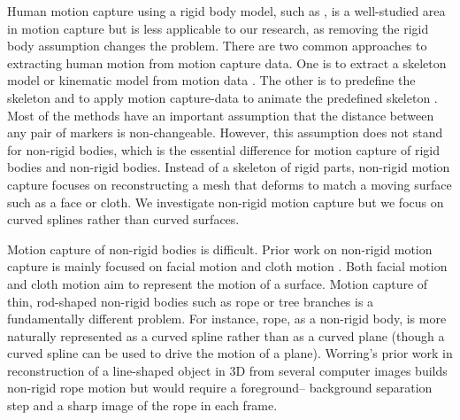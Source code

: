 Human motion capture using a rigid body model, such as \cite{Lou:EHM2010,Wen:2006:MCD,Rajko:2007:RAK,ZordanVictorBrian2003}, is a well-studied area in motion capture but is less applicable to our research, as removing the rigid body assumption changes the problem. There are two common approaches to extracting human motion from motion capture data. One is to extract a skeleton model or kinematic model from motion data \cite{Lou:EHM2010,Rajko:2007:RAK}. The other is to predefine the skeleton and to apply motion capture-data to animate the predefined skeleton \cite{Wen:2006:MCD,ZordanVictorBrian2003}. Most of the methods have an important assumption that the distance between any pair of markers is non-changeable. However, this assumption does not stand for non-rigid bodies, which is the essential difference for motion capture of rigid bodies and non-rigid bodies. Instead of a skeleton of rigid parts, non-rigid motion capture focuses on reconstructing a mesh that deforms to match a moving surface such as a face or cloth. We investigate non-rigid motion capture but we focus on curved splines rather than curved surfaces.

Motion capture of non-rigid bodies is difficult. Prior work on non-rigid motion capture is mainly focused on facial motion \cite{Lorenzo03,SifakisEftychios2005} and cloth motion \cite{MarcusVolker04clothmotion,whiteRyan2007siggraph,PritchardDavid2003,Bhat2003}. Both facial motion and cloth motion aim to represent the motion of a surface. Motion capture of thin, rod-shaped non-rigid bodies such as rope or tree branches is a fundamentally different problem. For instance, rope, as a non-rigid body, is more naturally represented as a curved spline rather than as a curved plane (though a curved spline can be used to drive the motion of a plane). Worring's \cite{WorringMarcel94measurementof} prior work in reconstruction of a line-shaped object in 3D from several computer images builds non-rigid rope motion but would require a foreground-- background separation step and a sharp image of the rope in each frame.

